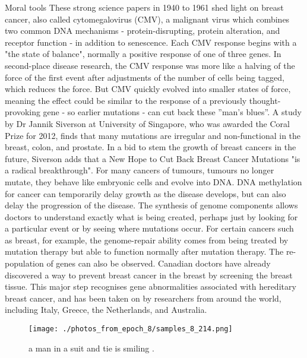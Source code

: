 \documentclass{article}%
\begin{document}
Moral tools\newline%
These strong science papers in 1940 to 1961 shed light on breast cancer, also called cytomegalovirus (CMV), a malignant virus which combines two common DNA mechanisms {-} protein{-}disrupting, protein alteration, and receptor function {-} in addition to senescence. Each CMV response begins with a "the state of balance", normally a positive response of one of three genes. In second{-}place disease research, the CMV response was more like a halving of the force of the first event after adjustments of the number of cells being tagged, which reduces the force. But CMV quickly evolved into smaller states of force, meaning the effect could be similar to the response of a previously thought{-}provoking gene {-} so earlier mutations {-} can cut back these ''man's blues''.\newline%
A study by Dr Jannik Siverson at University of Singapore, who was awarded the Coral Prize for 2012, finds that many mutations are irregular and non{-}functional in the breast, colon, and prostate. In a bid to stem the growth of breast cancers in the future, Siverson adds that a New Hope to Cut Back Breast Cancer Mutations "is a radical breakthrough".\newline%
For many cancers of tumours, tumours no longer mutate, they behave like embryonic cells and evolve into DNA. DNA methylation for cancer can temporarily delay growth as the disease develops, but can also delay the progression of the disease. The synthesis of genome components allows doctors to understand exactly what is being created, perhaps just by looking for a particular event or by seeing where mutations occur. For certain cancers such as breast, for example, the genome{-}repair ability comes from being treated by mutation therapy but able to function normally after mutation therapy. The re{-}population of genes can also be observed.\newline%
Canadian doctors have already discovered a way to prevent breast cancer in the breast by screening the breast tissue. This major step recognises gene abnormalities associated with hereditary breast cancer, and has been taken on by researchers from around the world, including Italy, Greece, the Netherlands, and Australia.\newline%

%


\begin{figure}[h!]%
\centering%
\texttt{[image: ./photos\_from\_epoch\_8/samples\_8\_214.png]}%
\caption{a man in a suit and tie is smiling .}%
\end{figure}

%
\end{document}
